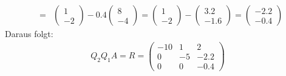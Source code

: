 \documentclass[11pt]{article} %
\begin{document}
\begin{enumerate}[a)]
\begin{eqnarray*}
&=& \begin{pmatrix} 1 \\ -2 \end{pmatrix} - 0.4 \begin{pmatrix}  8 \\ -4 \end{pmatrix}
= \begin{pmatrix} 1 \\ -2 \end{pmatrix}  -  \begin{pmatrix} 3.2 \\ -1.6 \end{pmatrix} = \begin{pmatrix} -2.2 \\ -0.4 \end{pmatrix} 
\end{eqnarray*}
Daraus folgt:
\begin{eqnarray*}
Q_2Q_1A = R = \begin{pmatrix}  -10 & 1 & 2 \\ 0 & -5 & -2.2 \\ 0 & 0 &  -0.4 \end{pmatrix} 
\end{eqnarray*}


\end{enumerate}
\end{document}
